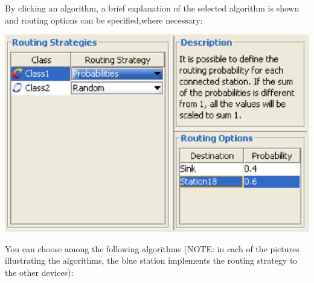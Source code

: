 By clicking an algorithm, a brief explanation of the selected algorithm is shown and routing options can be specified,where necessary:
\begin{center}
\includegraphics[scale=.5]{img/jsim/routing2.eps}
\end{center}
You can choose among the following algorithms (NOTE: in each of the pictures illustrating the algorithms, the blue station implements the routing strategy to the other devices):
